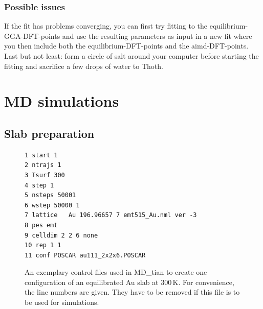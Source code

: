 \documentclass[twoside, 11pt, titlepage, captions=nooneline, a4paper, headsepline]{scrbook}%
\newcommand{\9}{\mathrm}
\newcommand{\0}{\,\mathrm}
\begin{document}
\subsection{Possible issues}
If the fit has problems converging, you can first try fitting to the equilibrium-GGA-DFT-points and use the resulting parameters as input in a new fit where you then include both the equilibrium-DFT-points and the aimd-DFT-points.
Last but not least: form a circle of salt around your computer before starting the fitting and sacrifice a few drops of water to Thoth.\\

\chapter{MD simulations}
\section{Slab preparation}
\begin{figure}[t!]
\centering
\begin{verbatim}
1 start 1
2 ntrajs 1
3 Tsurf 300
4 step 1
5 nsteps 50001
6 wstep 50000 1
7 lattice   Au 196.96657 7 emt515_Au.nml ver -3
8 pes emt
9 celldim 2 2 6 none 
10 rep 1 1
11 conf POSCAR au111_2x2x6.POSCAR
\end{verbatim}

\caption{\label{Fig:mxt:MD:prep_input}An exemplary control files used in MD\_tian to create one configuration of an equilibrated Au slab at 300\,K. For convenience, the line numbers are given. They have to be removed if this file is to be used for simulations.}
\end{figure}
\end{document}
